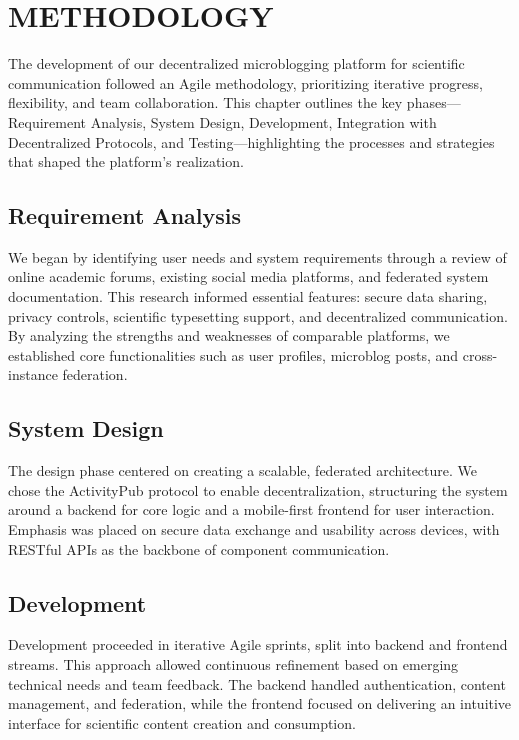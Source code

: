 \chapter{METHODOLOGY}

The development of our decentralized microblogging platform for scientific communication followed an Agile methodology, prioritizing iterative progress, flexibility, and team collaboration. This chapter outlines the key phases—Requirement Analysis, System Design, Development, Integration with Decentralized Protocols, and Testing—highlighting the processes and strategies that shaped the platform’s realization.

\section{Requirement Analysis}
\label{sec:requirements}

We began by identifying user needs and system requirements through a review of online academic forums, existing social media platforms, and federated system documentation. This research informed essential features: secure data sharing, privacy controls, scientific typesetting support, and decentralized communication. By analyzing the strengths and weaknesses of comparable platforms, we established core functionalities such as user profiles, microblog posts, and cross-instance federation.

\section{System Design}
\label{sec:design}

The design phase centered on creating a scalable, federated architecture. We chose the ActivityPub protocol to enable decentralization, structuring the system around a backend for core logic and a mobile-first frontend for user interaction. Emphasis was placed on secure data exchange and usability across devices, with RESTful APIs as the backbone of component communication.

\section{Development}
\label{sec:development}

Development proceeded in iterative Agile sprints, split into backend and frontend streams. This approach allowed continuous refinement based on emerging technical needs and team feedback. The backend handled authentication, content management, and federation, while the frontend focused on delivering an intuitive interface for scientific content creation and consumption.

